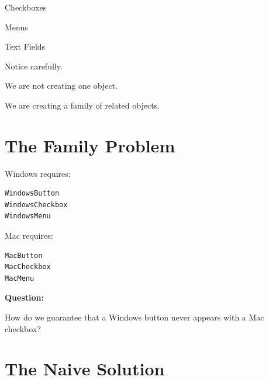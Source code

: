 \documentclass[11pt,a4paper]{book}
\begin{document}
Checkboxes


Menus


Text Fields


Notice carefully.


We are not creating one object.


We are creating a family of
related objects.


\section{The Family Problem}

Windows requires:

\begin{verbatim}
WindowsButton
WindowsCheckbox
WindowsMenu
\end{verbatim}


Mac requires:

\begin{verbatim}
MacButton
MacCheckbox
MacMenu
\end{verbatim}


\textbf{Question:}


How do we guarantee that a
Windows button never appears
with a Mac checkbox?


\section{The Naive Solution}
\end{document}
